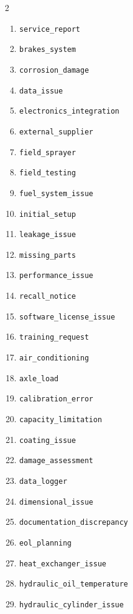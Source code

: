 \begin{multicols}{2}
\begin{enumerate}
    \item \texttt{service\_\allowbreak report}
    \item \texttt{brakes\_\allowbreak system}
    \item \texttt{corrosion\_\allowbreak damage}
    \item \texttt{data\_\allowbreak issue}
    \item \texttt{electronics\_\allowbreak integration}
    \item \texttt{external\_\allowbreak supplier}
    \item \texttt{field\_\allowbreak sprayer}
    \item \texttt{field\_\allowbreak testing}
    \item \texttt{fuel\_\allowbreak system\_\allowbreak issue}
    \item \texttt{initial\_\allowbreak setup}
    \item \texttt{leakage\_\allowbreak issue}
    \item \texttt{missing\_\allowbreak parts}
    \item \texttt{performance\_\allowbreak issue}
    \item \texttt{recall\_\allowbreak notice}
    \item \texttt{software\_\allowbreak license\_\allowbreak issue}
    \item \texttt{training\_\allowbreak request}
    \item \texttt{air\_\allowbreak conditioning}
    \item \texttt{axle\_\allowbreak load}
    \item \texttt{calibration\_\allowbreak error}
    \item \texttt{capacity\_\allowbreak limitation}
    \item \texttt{coating\_\allowbreak issue}
    \item \texttt{damage\_\allowbreak assessment}
    \item \texttt{data\_\allowbreak logger}
    \item \texttt{dimensional\_\allowbreak issue}
    \item \texttt{documentation\_\allowbreak discrepancy}
    \item \texttt{eol\_\allowbreak planning}
    \item \texttt{heat\_\allowbreak exchanger\_\allowbreak issue}
    \item \texttt{hydraulic\_\allowbreak oil\_\allowbreak temperature}
    \item \texttt{hydraulic\_\allowbreak cylinder\_\allowbreak issue}

\end{enumerate}
\end{multicols}
